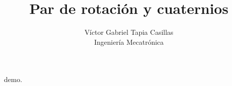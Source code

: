 \documentclass[10pt,a4paper]{article}
\title{Par de rotación y cuaternios}
\author{Víctor Gabriel Tapia Casillas\\ Ingeniería Mecatrónica}
\begin{document}
demo. \cite{Nobody06}



\end{document}
